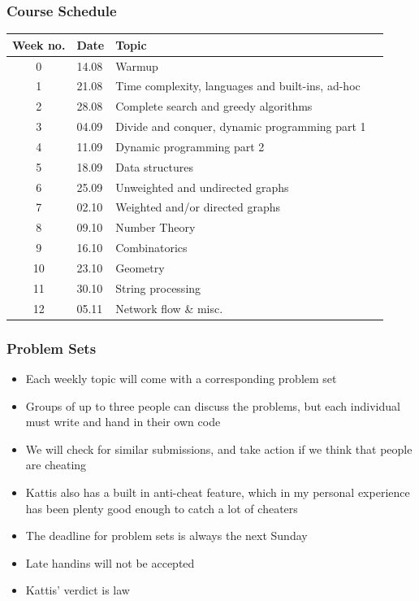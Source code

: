 \documentclass{beamer}
\begin{document}
\begin{frame}[plain]
	\frametitle{Course Schedule}
	\scriptsize
    \begin{center}
        \begin{tabular}{cl|ll}
            Week no. & Date & Topic \\
            \hline
            0 & 14.08 & Warmup \\
            1 & 21.08 & Time complexity, languages and built-ins, ad-hoc \\
            2 & 28.08 & Complete search and greedy algorithms \\
            3 & 04.09 & Divide and conquer, dynamic programming part 1 \\
            4 & 11.09 & Dynamic programming part 2 \\
            5 & 18.09 & Data structures \\
            6 & 25.09 & Unweighted and undirected graphs \\
            7 & 02.10 & Weighted and/or directed graphs \\
            8 & 09.10 & Number Theory \\
            9 & 16.10 & Combinatorics \\
            10 & 23.10 & Geometry \\
            11 & 30.10 & String processing \\
            12 & 05.11 & Network flow \& misc. \\
    		\end{tabular}
	\end{center}
\end{frame}
 
\begin{frame}[plain]
	\frametitle{Problem Sets}
	\begin{itemize}
		\item Each weekly topic will come with a corresponding problem set
		\item Groups of up to three people can discuss the problems, but each individual must write and hand in their own code
        \item We will check for similar submissions, and take action if we think that people are cheating
        \item Kattis also has a built in anti-cheat feature, which in my personal experience has been plenty good enough to catch a lot of cheaters
        \item The deadline for problem sets is always the next Sunday
        \item Late handins will not be accepted
        \item Kattis' verdict is law
	\end{itemize}
\end{frame} 
\end{document}
